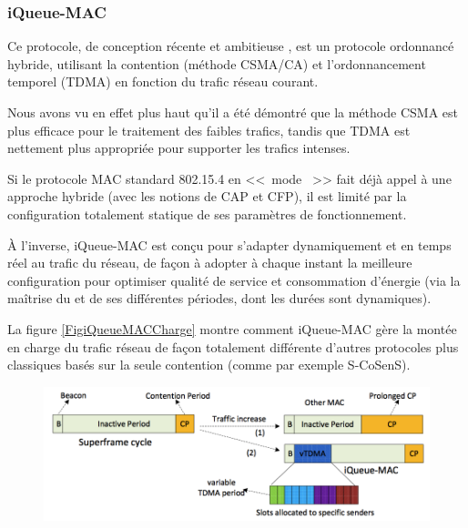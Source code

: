 \subsubsection{iQueue-MAC}
\label{PariQueueMAC}

Ce protocole, de conception récente et ambitieuse \cite{iQueueMAC}, est un
protocole ordonnancé hybride, utilisant la contention (méthode CSMA/CA)
et l'ordonnancement temporel (TDMA) en fonction du trafic réseau courant.

Nous avons vu en effet plus haut qu'il a été démontré que la méthode CSMA
est plus efficace pour le traitement des faibles trafics, tandis que TDMA
est nettement plus appropriée pour supporter les trafics intenses.

Si le protocole MAC standard 802.15.4 en <<~mode ~>> fait
déjà appel à une approche hybride (avec les notions de CAP et CFP), il est
limité par la configuration totalement statique de ses paramètres de
fonctionnement.

À l'inverse, iQueue-MAC est conçu pour s'adapter dynamiquement et en
temps réel au trafic du réseau, de façon à adopter à chaque instant la
meilleure configuration pour optimiser qualité de service et consommation
d'énergie (via la maîtrise du  et de ses différentes
périodes, dont les durées sont dynamiques).

La figure \vref{FigiQueueMACCharge} montre comment iQueue-MAC gère la
montée en charge du trafic réseau de façon totalement différente d'autres
protocoles plus classiques basés sur la seule contention (comme par exemple
S-CoSenS).

\begin{figure}[!hbt]
\centering
\includegraphics[width=12.5cm]{images/ch3-iqueue-mac-charge.png}
\label{FigiQueueMACCharge}
\end{figure}

